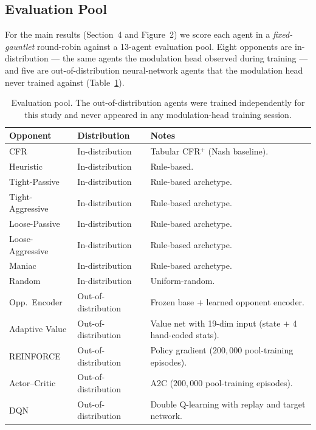 \subsection{Evaluation Pool}

For the main results (Section~4 and Figure~2) we score each agent in a
\emph{fixed-gauntlet} round-robin against a 13-agent evaluation pool.
Eight opponents are in-distribution --- the same agents the modulation
head observed during training --- and five are out-of-distribution
neural-network agents that the modulation head never trained against
(Table~\ref{tab:eval-pool}).

\begin{table}[h]
\centering
\caption{Evaluation pool. The out-of-distribution agents were trained
independently for this study and never appeared in any modulation-head
training session.}
\label{tab:eval-pool}
\begin{tabular}{lll}
\toprule
\textbf{Opponent} & \textbf{Distribution} & \textbf{Notes} \\
\midrule
CFR              & In-distribution  & Tabular CFR$^+$ (Nash baseline). \\
Heuristic        & In-distribution  & Rule-based. \\
Tight-Passive    & In-distribution  & Rule-based archetype. \\
Tight-Aggressive & In-distribution  & Rule-based archetype. \\
Loose-Passive    & In-distribution  & Rule-based archetype. \\
Loose-Aggressive & In-distribution  & Rule-based archetype. \\
Maniac           & In-distribution  & Rule-based archetype. \\
Random           & In-distribution  & Uniform-random. \\
\midrule
Opp.\ Encoder    & Out-of-distribution & Frozen base $+$ learned opponent encoder. \\
Adaptive Value   & Out-of-distribution & Value net with 19-dim input (state $+$ 4 hand-coded stats). \\
REINFORCE        & Out-of-distribution & Policy gradient ($200{,}000$ pool-training episodes). \\
Actor--Critic    & Out-of-distribution & A2C ($200{,}000$ pool-training episodes). \\
DQN              & Out-of-distribution & Double Q-learning with replay and target network. \\
\bottomrule
\end{tabular}
\end{table}

